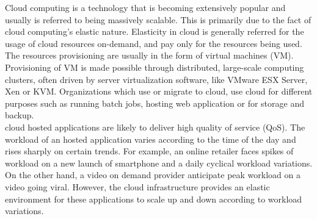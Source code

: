 

Cloud computing\cite{mell2011nist} is a technology that is becoming extensively popular and usually is referred to being massively scalable. This is primarily due to the fact of cloud computing's elastic nature. Elasticity in cloud is generally referred for the usage of cloud resources on-demand\cite{mell2011nist}, and pay only for the resources being used. The resources provisioning are usually in the form of virtual machines (VM). Provisioning of VM is made possible through distributed, large-scale computing clusters, often driven by server virtualization software, like VMware ESX Server\cite{vmwareesx}, Xen\cite{xenhyper} or KVM\cite{kvmhyper}. Organizations which use or migrate to cloud, use cloud for different purposes such as running batch jobs, hosting web application or for storage and backup.
\\
cloud hosted applications are likely to deliver high quality of service (QoS). The workload of an hosted application varies according to the time of the day and rises sharply on certain trends. For example, an online retailer faces spikes of workload on a new launch of smartphone and a daily cyclical workload variations\cite{dawoud2013scalability}. On the other hand, a video on demand provider anticipate peak workload on a video going viral\cite{niu2012quality}. However, the cloud infrastructure provides an elastic environment for these applications to scale up and down according to workload variations.

